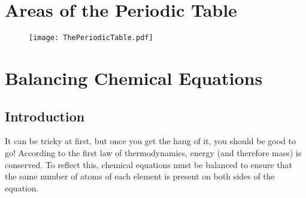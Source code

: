 \documentclass[10pt, roman]{article}
\begin{document}
\section{Areas of the Periodic Table}
\begin{figure}[ht!]
\centering
\texttt{[image: ThePeriodicTable.pdf]}
\label{overflow}
\end{figure}
\section{Balancing Chemical Equations}
\subsection{Introduction}
It can be tricky at first, but once you get the hang of it, you should be good to go!
According to the first law of thermodynamics, energy (and therefore mass) is conserved.
To reflect this, chemical equations must be balanced to ensure that the same number of atoms of each element is present on both sides of the equation.
\end{document}
